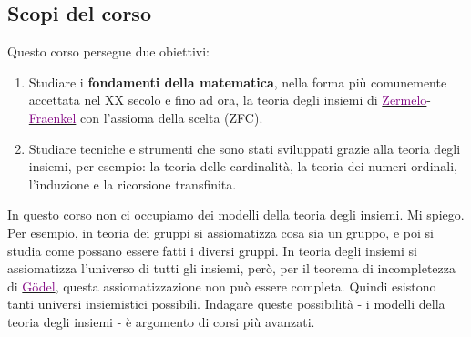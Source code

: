 \subsection{Scopi del corso}
Questo corso persegue due obiettivi:
\begin{enumerate}[(1)]
	\item Studiare i \textbf{fondamenti della matematica}, nella forma più comunemente accettata nel XX secolo e fino ad ora, la teoria degli insiemi di 
	\href{https://it.wikipedia.org/wiki/Ernst_Zermelo}{\textcolor{purple}{Zermelo}}-\href{https://it.wikipedia.org/wiki/Adolf_Abraham_Halevi_Fraenkel}{\textcolor{purple}{Fraenkel}} con l'assioma della scelta (ZFC).
	\item Studiare tecniche e strumenti che sono stati sviluppati grazie alla teoria degli insiemi, per esempio: la teoria delle cardinalità, la teoria dei numeri ordinali, l'induzione e la ricorsione transfinita.
\end{enumerate}

In questo corso non ci occupiamo dei modelli della teoria degli insiemi. Mi spiego. Per esempio, in teoria dei gruppi si assiomatizza cosa sia un gruppo, e poi si studia come possano essere fatti i diversi gruppi. In 
teoria degli insiemi si assiomatizza l'universo di tutti gli insiemi, però, per il teorema di incompletezza di \href{https://it.wikipedia.org/wiki/Kurt_G%C3%B6del}{\textcolor{purple}{Gödel}}, questa assiomatizzazione non 
può essere completa. Quindi esistono tanti universi insiemistici possibili. Indagare queste possibilità - i modelli della teoria degli insiemi - è argomento di corsi più avanzati.
